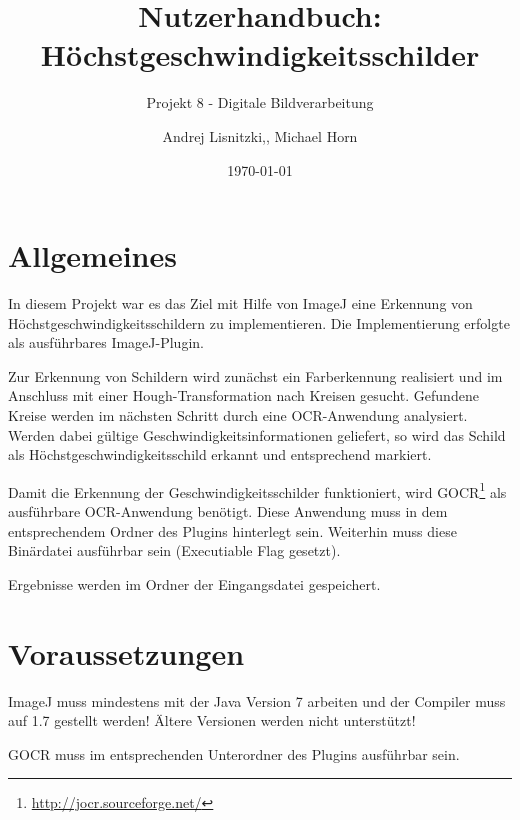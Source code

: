 						

\title{Nutzerhandbuch:  Höchstgeschwindigkeitsschilder}
\subtitle{Projekt 8 - Digitale Bildverarbeitung}

\author{Andrej Lisnitzki,, Michael Horn\vspace{4cm}}
\date{\today}

\maketitle

\section{Allgemeines}
In diesem Projekt war es das Ziel mit Hilfe von ImageJ eine Erkennung von Höchstgeschwindigkeitsschildern zu implementieren.
Die Implementierung erfolgte als ausführbares ImageJ-Plugin.

Zur Erkennung von Schildern wird zunächst ein Farberkennung realisiert und im Anschluss mit einer Hough-Transformation nach Kreisen gesucht.
Gefundene Kreise werden im nächsten Schritt durch eine OCR-Anwendung analysiert.
Werden dabei gültige Geschwindigkeitsinformationen geliefert, so wird das Schild als Höchstgeschwindigkeitsschild erkannt und entsprechend markiert.

Damit die Erkennung der Geschwindigkeitsschilder funktioniert, wird GOCR\footnote{\url{http://jocr.sourceforge.net/}} als ausführbare OCR-Anwendung benötigt.
Diese Anwendung muss in dem entsprechendem Ordner des Plugins hinterlegt sein.
Weiterhin muss diese Binärdatei ausführbar sein (Executiable Flag gesetzt).

Ergebnisse werden im Ordner der Eingangsdatei gespeichert.

\section{Voraussetzungen}
ImageJ muss mindestens mit der Java Version 7 arbeiten und der Compiler muss auf 1.7 gestellt werden!
Ältere Versionen werden nicht unterstützt!

GOCR muss im entsprechenden Unterordner des Plugins ausführbar sein.

\pagebreak
